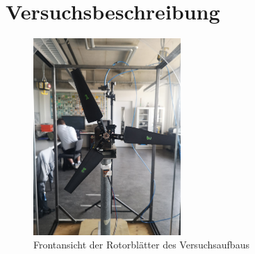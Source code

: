 \section{Versuchsbeschreibung}
\label{section:Versuchsbeschreibung}
\begin{figure}[h!]
    \centering
    \includegraphics[width=0.5\textwidth]{Abbildungen/Fluegelfront.jpeg}
    \caption{Frontansicht der Rotorblätter des Versuchsaufbaus}
    \label{fig:Fluegelfront}
\end{figure}